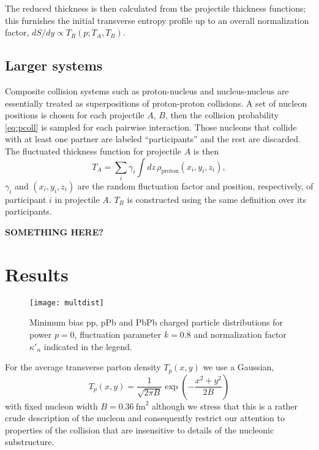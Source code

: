 \documentclass[aps,prl,reprint,amsmath,nofootinbib]{revtex4-1}
\begin{document}
The reduced thickness is then calculated from the projectile thickness functions; this furnishes the initial
transverse entropy profile up to an overall normalization factor, $dS/dy \propto T_R(p; T_A, T_B)$.

\subsection{Larger systems}

Composite collision systems such as proton-nucleus and nucleus-nucleus are essentially treated as
superpositions of proton-proton collisions.  A set of nucleon positions is chosen for each
projectile $A$, $B$, then the collision probability \eqref{eq:pcoll} is sampled for each pairwise interaction.
Those nucleons that collide with at least one partner are labeled ``participants'' and the rest are discarded.
The fluctuated thickness function for projectile $A$ is then
\begin{equation}
  T_A = \sum_i \gamma_i \int dz \, \rho_\text{proton}(x_i, y_i, z_i),
\end{equation}
$\gamma_i$ and $(x_i, y_i, z_i)$ are the random fluctuation factor and position, respectively, of participant
$i$ in projectile $A$.  $T_B$ is constructed using the same definition over its participants.

\textbf{SOMETHING HERE?}


\section{Results}

\begin{figure*}[t]
  \texttt{[image: multdist]}
  \caption{\label{fig:multdist}Minimum bias pp, pPb and PbPb charged particle distributions for power $p=0$,
  fluctuation parameter $k=0.8$ and normalization factor $\kappa'_n$ indicated in the legend.}
\end{figure*}

For the average transverse parton density $T_p(x,y)$ we use a Gaussian,
\begin{equation}
  T_p(x,y) = \frac{1}{\sqrt{2 \pi B}} \exp\left(-\frac{x^2+y^2}{2 B}\right)
\end{equation}
with fixed nucleon width $B=0.36 ~\mathrm{fm}^2$ although we stress that this is a rather crude description of
the nucleon and consequently restrict our attention to properties of the collision that are insensitive to
details of the nucleonic substructure.
\end{document}
